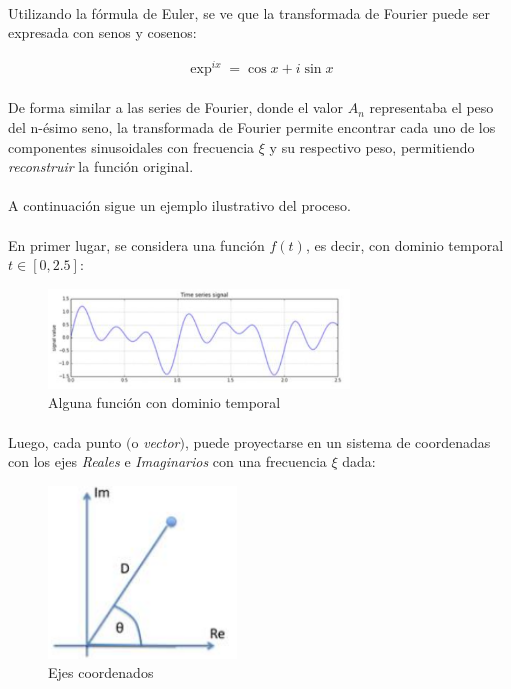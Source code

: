 \documentclass[12pt, twocolumn]{article}
\begin{document}
	\paragraph{} Utilizando la fórmula de Euler, se ve que la transformada de Fourier puede ser expresada con senos y cosenos:
	
	\begin{align*}
		\exp^{ix}=\cos x + i \sin x
	\end{align*}
	
	\paragraph{} De forma similar a las series de Fourier, donde el valor $A_{n}$ representaba el peso del n-ésimo seno, la transformada de Fourier permite encontrar cada uno de los componentes sinusoidales con frecuencia $\xi$ y su respectivo peso, permitiendo \textit{reconstruir} la función original.
	
	\paragraph{} A continuación sigue un ejemplo ilustrativo del proceso.
	
	\paragraph{} En primer lugar, se considera una función $f(t)$, es decir, con dominio temporal $t \in \left[0,2.5\right]$:
	
	\begin{figure}[H]
		\centering
		\includegraphics[width=8cm]{ft.png}
		\caption{Alguna función con dominio temporal}
		\label{ft}
	\end{figure}
	
	\paragraph{} Luego, cada punto $($o \textit{vector}$)$, puede proyectarse en un sistema de coordenadas con los ejes \textit{Reales} e \textit{Imaginarios} con una frecuencia $\xi$ dada:
	
	\begin{figure}[H]
		\centering
		\includegraphics[width=5cm]{imre.png}
		\caption{Ejes coordenados}
		\label{imre}
	\end{figure}
	
\end{document}
